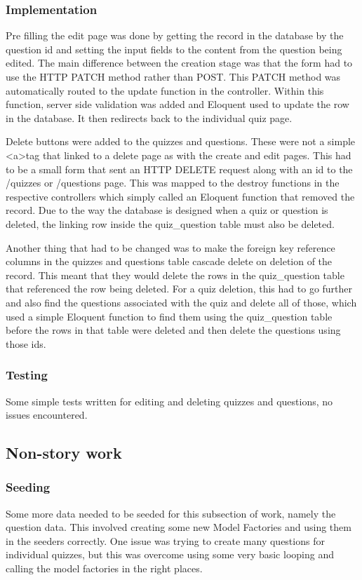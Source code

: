 \subsubsection{Implementation}
Pre filling the edit page was done by getting the record in the database by the question id and setting the input fields to the content from the question being edited. The main difference between the creation stage was that the form had to use the HTTP PATCH method rather than POST. This PATCH method was automatically routed to the update function in the controller\cite{laravel-resource-controller}. Within this function, server side validation was added and Eloquent used to update the row in the database. It then redirects back to the individual quiz page.

Delete buttons were added to the quizzes and questions. These were not a simple \textless a\textgreater tag that linked to a delete page as with the create and edit pages. This had to be a small form that sent an HTTP DELETE request along with an id to the /quizzes or /questions page. This was mapped to the destroy functions in the respective controllers which simply called an Eloquent function that removed the record. Due to the way the database is designed when a quiz or question is deleted, the linking row inside the quiz\_question table must also be deleted. 

Another thing that had to be changed was to make the foreign key reference columns in the quizzes and questions table cascade delete on deletion of the record. This meant that they would delete the rows in the quiz\_question table that referenced the row being deleted. For a quiz deletion, this had to go further and also find the questions associated with the quiz and delete all of those, which used a simple Eloquent function to find them using the quiz\_question table before the rows in that table were deleted and then delete the questions using those ids. 
\subsubsection{Testing}
Some simple tests written for editing and deleting quizzes and questions, no issues encountered.
\newpage

\subsection{Non-story work}
\subsubsection{Seeding}
Some more data needed to be seeded for this subsection of work, namely the question data. This involved creating some new Model Factories and using them in the seeders correctly. One issue was trying to create many questions for individual quizzes, but this was overcome using some very basic looping and calling the model factories in the right places.
